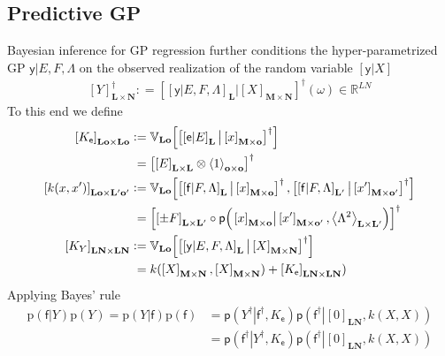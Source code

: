 \documentclass[preprint,12pt]{elsarticle}
\newcommand*{\M}[1]{\ensuremath{#1}\xspace}
\newcommand*{\x}{\times}
\newcommand*{\mi}[1]{\mathbf{#1}}
\newcommand*{\st}[1]{\mathbb{#1}}
\newcommand*{\rv}[1]{\mathsf{#1}}
\newcommand*{\te}[2][]{\left\lbrack{#2}\right\rbrack_{#1}}
\newcommand*{\diag}[2][]{\left\langle{#2}\right\rangle_{#1}}
\newcommand*{\prob}[3]{\M{\mathsf{p}\!\left(\left.{#1}\right\vert{#2,#3}\right)}}
\newcommand*{\deq}{\M{\mathrel{\mathop:}=}}
\newcommand*{\cov}[3][]{\ifthenelse{\equal{#1}{}}{\mathbb{V}_{#3}\!\left\lbrack{#2}\right\rbrack}{\mathbb{V}_{#3}\!\left\lbrack{#2,#1}\right\rbrack}}
\begin{document}
        \subsection{Predictive GP} \label{sub:GP:Predictive}
            Bayesian inference for GP regression further conditions the hyper-parametrized GP $\rv{y} \vert E,F,\Lambda$ on the observed realization of the random variable $\te{\rv{y}\vert X}$
            \begin{equation*}
                \te[\mi{L} \x \mi{N}]{Y}^{\dagger} \deq \te{\te[\mi{L}]{\rv{y}\vert E,F,\Lambda} \big\vert \te[\mi{M}\x\mi{N}]{X}}^{\dagger}\!(\omega) \in \st{R}^{LN}
            \end{equation*}
            To this end we define
            \begin{equation} \label{def:GP:Kk}
                \begin{aligned}
                    \te[\mi{Lo}\x\mi{Lo}]{K_{\rv{e}}} &\deq 
                    \cov{\te{\te[\mi{L}]{\rv{e}\vert E} \big\vert \te[\mi{M}\x\mi{o}]{x}}^{\dagger}}{\mi{Lo}} \\
                    &\phantom{:}= \te{\te[\mi{L}\x\mi{L}]{E} \otimes \diag[\mi{o}\x\mi{o}]{1}}^{\dagger} \\
                    \te[\mi{Lo}\x\mi{L^{\prime}o^{\prime}}]{k(x, x^{\prime})} &\deq
                    \cov[{\te{\te[\mi{L^{\prime}}]{\rv{f}\vert F,\Lambda} \big\vert \te[\mi{M}\x\mi{o^{\prime}}]{x^{\prime}}}^{\dagger}}]
                    {\te{\te[\mi{L}]{\rv{f}\vert F,\Lambda} \big\vert \te[\mi{M}\x\mi{o}]{x}}^{\dagger}}{\mi{Lo}} \\
                    &\phantom{:}= \te{\te[\mi{L}\x\mi{L^{\prime}}]{\pm F} \circ 
                    \prob{\te[\mi{M}\x\mi{o}]{x}}{\te[\mi{M}\x\mi{o^{\prime}}]{x^{\prime}}}
                    {\diag[\mi{L}\x\mi{L^{\prime}}]{\Lambda^{2}}}}^{\dagger} \\
                    \te[\mi{LN}\x\mi{LN}]{K_{Y}} &\deq 
                    \cov{\te{\te[\mi{L}]{\rv{y}\vert E,F,\Lambda} \big\vert \te[\mi{M}\x\mi{N}]{X}}^{\dagger}}{\mi{Lo}} \\
                    &\phantom{:}= k(\te[\mi{M}\x\mi{N}]{X},\te[\mi{M}\x\mi{N}]{X}) + \te[\mi{LN}\x\mi{LN}]{K_{\rv{e}}})
                \end{aligned}
            \end{equation}
            Applying Bayes' rule
            \begin{equation*}
                \begin{aligned}
                    \mathrm{p}(\rv{f}\vert Y)\mathrm{p}(Y) = \mathrm{p}(Y\vert \rv{f})\mathrm{p}(\rv{f})
                    &= \prob{Y^{\dagger}}{\rv{f}^{\dagger}}{K_{\rv{e}}} \prob{\rv{f}^{\dagger}}{\te[\mi{LN}]{0}}{k(X,X)} \\
                    &= \prob{\rv{f}^{\dagger}}{Y^{\dagger}}{K_{\rv{e}}} \prob{\rv{f}^{\dagger}}{\te[\mi{LN}]{0}}{k(X,X)}
                \end{aligned}
            \end{equation*}
\end{document}
